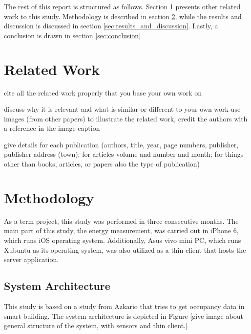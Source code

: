 \documentclass[journal]{vgtc}                %
\begin{document}
The rest of this report is structured as follows. Section \ref{sec:related_work} presents other related work to this study. Methodology is described in section \ref{sec:methodology}, while the results and discussion is discussed in section \ref{sec:results_and_discussion}. Lastly, a conclusion is drawn in section \ref{sec:conclusion}

\section{Related Work} %
\label{sec:related_work}
cite all the related work properly that you base your own work on

discuss why it is relevant and what is similar or different to your own work
use images (from other papers) to illustrate the related work, credit the authors with a reference in the image caption

give details for each publication (authors, title, year, page numbers, publisher, publisher address (town); for articles volume and number and month; for things other than books, articles, or papers also the type of publication)


\section{Methodology} %
\label{sec:methodology}
As a term project, this study was performed in three consecutive months. The main part of this study, the energy measurement, was carried out in iPhone 6, which runs iOS operating system. Additionally, Asus vivo mini PC, which runs Xubuntu as its operating system, was also utilized as a thin client that hosts the server application.

\subsection{System Architecture} %
\label{sub:system_architecture}
This study is based on a study from Azkario that tries to get occupancy data in smart building. The system architecture is depicted in Figure 
[give image about general structure of the system, with sensors and thin client.]
\end{document}
